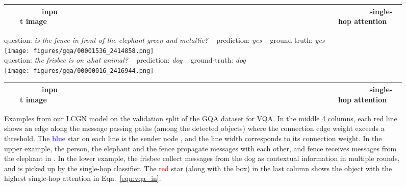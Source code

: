 \documentclass[10pt,twocolumn,letterpaper]{article}
\begin{document}
\begin{figure*}[t]
\centering
\small
\begin{tabularx}{\linewidth}{*{6}{c}}
~~~~~~~~input image & ~~~~~~~~~~~~~~~~~ & ~~~~~~~~~~~~~~~~~~~~~~~ & ~~~~~~~~~~~~~~~~~~~~~~ & ~~~~~~~~~~~~~~~~~~~~~~~ & ~~~~~~~~~single-hop attention  \\
\hline
\end{tabularx}

\vspace{1mm}

question: \textit{is the fence in front of the elephant green and metallic?} ~ prediction: \textit{yes} ~ ground-truth: \textit{yes} \\
\texttt{[image: figures/gqa/00001536\_2414858.png]} \\

question: \textit{the frisbee is on what animal?} ~ prediction: \textit{dog} ~ ground-truth: \textit{dog} \\
\texttt{[image: figures/gqa/00000016\_2416944.png]} \\

\caption{Examples from our LCGN model on the validation split of the GQA dataset for VQA. In the middle 4 columns, each red line shows an edge  along the message passing paths (among the  detected objects) where the connection edge weight  exceeds a threshold. The \textcolor{blue}{blue} star on each line is the sender node , and the line width corresponds to its connection weight. In the upper example, the person, the elephant and the fence propagate messages with each other, and fence receives messages from the elephant in . In the lower example, the frisbee collect messages from the dog as contextual information in multiple rounds, and is picked up by the single-hop classifier. The \textcolor{red}{red} star (along with the box) in the last column shows the object with the highest single-hop attention  in Eqn.~\ref{eqn:vqa_in}.}
\label{fig:gqa_vis}

\vspace{1em}

\centering
\small
\begin{tabularx}{\linewidth}{*{6}{c}}
~~~~~~~~input image & ~~~~~~~~~~~~~~~~~ & ~~~~~~~~~~~~~~~~~~~~~~~ & ~~~~~~~~~~~~~~~~~~~~~~ & ~~~~~~~~~~~~~~~~~~~~~~~ & ~~~~~~~~~single-hop attention  \\
\hline
\end{tabularx}


\end{figure*}
\end{document}
